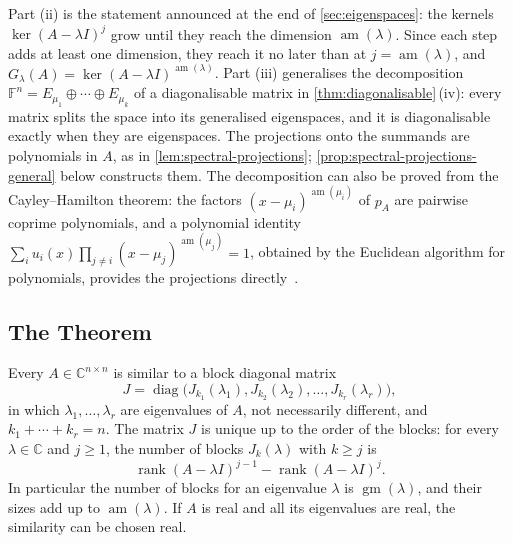 Part (ii) is the statement announced at the end of \cref{sec:eigenspaces}: the kernels $\ker(A-\lambda I)^j$ grow until they reach the dimension $\operatorname{am}(\lambda)$. Since each step adds at least one dimension, they reach it no later than at $j=\operatorname{am}(\lambda)$, and $G_\lambda(A)=\ker(A-\lambda I)^{\operatorname{am}(\lambda)}$. Part (iii) generalises the decomposition $\mathbb F^n=E_{\mu_1}\oplus\cdots\oplus E_{\mu_k}$ of a diagonalisable matrix in \cref{thm:diagonalisable}\,(iv): every matrix splits the space into its generalised eigenspaces, and it is diagonalisable exactly when they are eigenspaces. The projections onto the summands are polynomials in $A$, as in \cref{lem:spectral-projections}; \cref{prop:spectral-projections-general} below constructs them. The decomposition can also be proved from the Cayley--Hamilton theorem: the factors $(x-\mu_i)^{\operatorname{am}(\mu_i)}$ of $p_A$ are pairwise coprime polynomials, and a polynomial identity $\sum_iu_i(x)\prod_{j\ne i}(x-\mu_j)^{\operatorname{am}(\mu_j)}=1$, obtained by the Euclidean algorithm for polynomials, provides the projections directly~\cite[Sect.~6.8]{hoffman1971}.

\subsection{The Theorem}

\begin{theorem}
\label{thm:jordan-form}
Every $A\in\mathbb C^{n\times n}$ is similar to a block diagonal matrix
\[
J=\operatorname{diag}\bigl(J_{k_1}(\lambda_1),J_{k_2}(\lambda_2),\ldots,J_{k_r}(\lambda_r)\bigr),
\]
in which $\lambda_1,\ldots,\lambda_r$ are eigenvalues of $A$, not necessarily different, and $k_1+\cdots+k_r=n$. The matrix $J$ is unique up to the order of the blocks: for every $\lambda\in\mathbb C$ and $j\ge1$, the number of blocks $J_k(\lambda)$ with $k\ge j$ is
\[
\operatorname{rank}(A-\lambda I)^{j-1}-\operatorname{rank}(A-\lambda I)^j .
\]
In particular the number of blocks for an eigenvalue $\lambda$ is $\operatorname{gm}(\lambda)$, and their sizes add up to $\operatorname{am}(\lambda)$. If $A$ is real and all its eigenvalues are real, the similarity can be chosen real.
\end{theorem}

